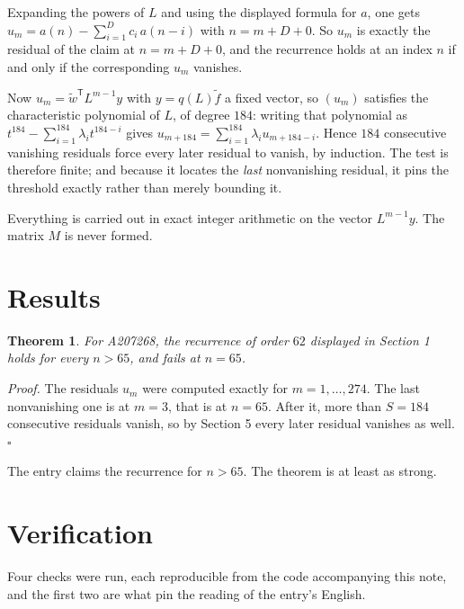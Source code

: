 \documentclass[11pt]{article}
\newtheorem{theorem}{Theorem}
\theoremstyle{definition}
\begin{document}
Expanding the powers of $L$ and using the displayed formula for $a$, one gets $u_m = a(n) - \sum_{i=1}^{D} c_i\,a(n-i)$ with $n = m + D + 0$. So $u_m$ is exactly the residual of the claim at $n = m + D + 0$, and the recurrence holds at an index $n$ if and only if the corresponding $u_m$ vanishes.

Now $u_m = \tilde w^{\mathsf T} L^{m-1} y$ with $y = q(L)\tilde f$ a fixed vector, so $(u_m)$ satisfies the characteristic polynomial of $L$, of degree $184$: writing that polynomial as $t^{184} - \sum_{i=1}^{184} \lambda_i t^{184-i}$ gives $u_{m+184} = \sum_{i=1}^{184} \lambda_i u_{m+184-i}$. Hence $184$ consecutive vanishing residuals force every later residual to vanish, by induction. The test is therefore finite; and because it locates the {\itshape last} nonvanishing residual, it pins the threshold exactly rather than merely bounding it.

Everything is carried out in exact integer arithmetic on the vector $L^{m-1}y$. The matrix $M$ is never formed.

\section{Results}

\begin{theorem} For A207268, the recurrence of order $62$ displayed in Section 1 holds for every $n > 65$, and fails at $n = 65$.\end{theorem}

{\itshape Proof.} The residuals $u_m$ were computed exactly for $m = 1,\dots,274$. The last nonvanishing one is at $m = 3$, that is at $n = 65$. After it, more than $S = 184$ consecutive residuals vanish, so by Section 5 every later residual vanishes as well. $\square$

The entry claims the recurrence for $n > 65$. The theorem is at least as strong.

\section{Verification}

Four checks were run, each reproducible from the code accompanying this note, and the first two are what pin the reading of the entry's English.
\end{document}
